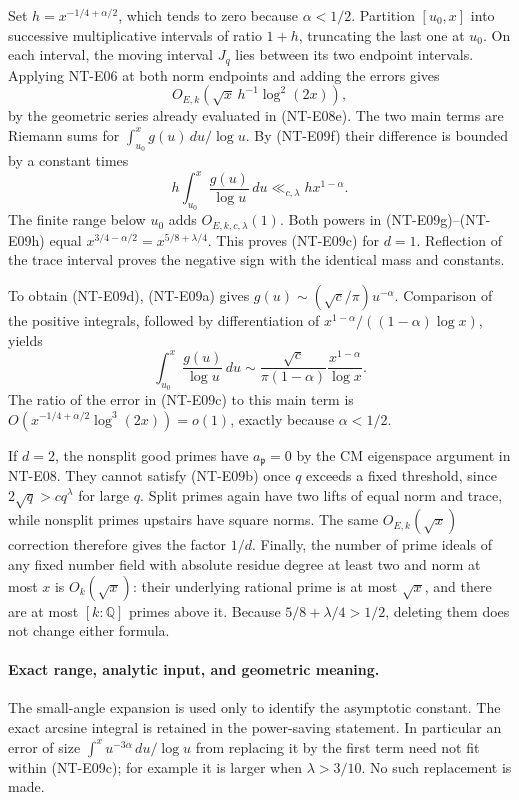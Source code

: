Set $h=x^{-1/4+\alpha/2}$, which tends to zero because $\alpha<1/2$.
Partition $[u_0,x]$ into successive multiplicative intervals of
ratio $1+h$, truncating the last one at $u_0$. On each interval,
the moving interval $J_q$ lies between its two endpoint intervals.
Applying NT-E06 at both norm endpoints and adding the errors gives
\[
 O_{E,k}\!\left(\sqrt x\,h^{-1}\log^2(2x)\right),
                                                               \tag{NT-E09g}
\]
by the geometric series already evaluated in (NT-E08e).
The two main terms are Riemann sums for
$\int_{u_0}^x g(u)\,du/\log u$. By (NT-E09f) their difference is
bounded by a constant times
\[
 h\int_{u_0}^x\frac{g(u)}{\log u}\,du
    \ll_{c,\lambda}h x^{1-\alpha}.                      \tag{NT-E09h}
\]
The finite range below $u_0$ adds $O_{E,k,c,\lambda}(1)$.
Both powers in (NT-E09g)--(NT-E09h) equal
$x^{3/4-\alpha/2}=x^{5/8+\lambda/4}$. This proves (NT-E09c)
for $d=1$. Reflection of the trace interval proves the negative
sign with the identical mass and constants.

To obtain (NT-E09d), (NT-E09a) gives
$g(u)\sim(\sqrt c/\pi)u^{-\alpha}$. Comparison of the positive
integrals, followed by differentiation of
$x^{1-\alpha}/((1-\alpha)\log x)$, yields
\[
 \int_{u_0}^x\frac{g(u)}{\log u}\,du
     \sim\frac{\sqrt c}{\pi(1-\alpha)}
                           \frac{x^{1-\alpha}}{\log x}.
\]
The ratio of the error in (NT-E09c) to this main term is
$O(x^{-1/4+\alpha/2}\log^3(2x))=o(1)$, exactly because
$\alpha<1/2$.

If $d=2$, the nonsplit good primes have $a_{\mathfrak p}=0$ by
the CM eigenspace argument in NT-E08. They cannot satisfy
(NT-E09b) once $q$ exceeds a fixed threshold, since
$2\sqrt q>c q^\lambda$ for large $q$. Split primes again have two
lifts of equal norm and trace, while nonsplit primes upstairs have
square norms. The same $O_{E,k}(\sqrt x)$ correction therefore gives
the factor $1/d$. Finally, the number of prime ideals of any fixed
number field with absolute residue degree at least two and norm at
most $x$ is $O_k(\sqrt x)$: their underlying rational prime is at
most $\sqrt x$, and there are at most $[k:\mathbb Q]$ primes above it.
Because $5/8+\lambda/4>1/2$, deleting them does not change either
formula.

\paragraph{Exact range, analytic input, and geometric meaning.}
The small-angle expansion is used only to identify the asymptotic
constant. The exact arcsine integral is retained in the
power-saving statement. In particular an error of size
$\int^{x}u^{-3\alpha}\,du/\log u$ from replacing it by the first
term need not fit within (NT-E09c); for example it is larger when
$\lambda>3/10$. No such replacement is made.


